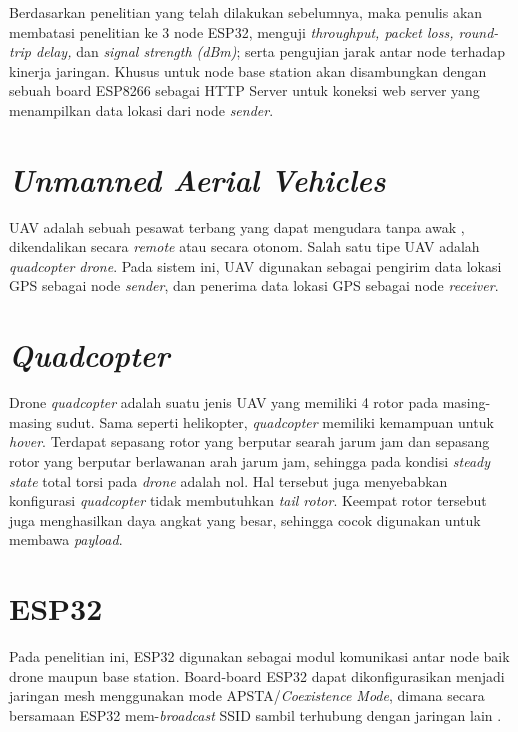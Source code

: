 Berdasarkan penelitian yang telah dilakukan sebelumnya, maka penulis akan membatasi penelitian ke 3 node ESP32, menguji \textit{throughput, packet loss, round-trip delay,} dan \textit{signal strength (dBm)}; serta pengujian jarak antar node terhadap kinerja jaringan. Khusus untuk node base station akan disambungkan dengan sebuah board ESP8266 sebagai HTTP Server untuk koneksi web server yang menampilkan data lokasi dari node \textit{sender}.

\section{\textit{Unmanned Aerial Vehicles}}
UAV adalah sebuah pesawat terbang yang dapat mengudara tanpa awak \cite{lakshminarayananJointNetworkDisaster2015}, dikendalikan secara \textit{remote} atau secara otonom. Salah satu tipe UAV adalah \textit{quadcopter drone}. Pada sistem ini, UAV digunakan sebagai pengirim data lokasi GPS sebagai node \textit{sender}, dan penerima data lokasi GPS sebagai node \textit{receiver}.

\section{\textit{Quadcopter}}
Drone \textit{quadcopter} adalah suatu jenis UAV yang memiliki 4 rotor pada masing-masing sudut. Sama seperti helikopter, \textit{quadcopter} memiliki kemampuan untuk \textit{hover}. Terdapat sepasang rotor yang berputar searah jarum jam dan sepasang rotor yang berputar berlawanan arah jarum jam, sehingga pada kondisi \textit{steady state} total torsi pada \textit{drone} adalah nol. Hal tersebut juga menyebabkan konfigurasi \textit{quadcopter} tidak membutuhkan \textit{tail rotor}. Keempat rotor tersebut juga menghasilkan daya angkat yang besar, sehingga cocok digunakan untuk membawa \textit{payload}.

\section{ESP32}
Pada penelitian ini, ESP32 digunakan sebagai modul komunikasi antar node baik drone maupun base station. Board-board ESP32 dapat dikonfigurasikan menjadi jaringan mesh menggunakan mode APSTA/\textit{Coexistence Mode}, dimana secara bersamaan ESP32 mem-\textit{broadcast} SSID sambil terhubung dengan jaringan lain \cite{WiFiDriverESP32}. 

